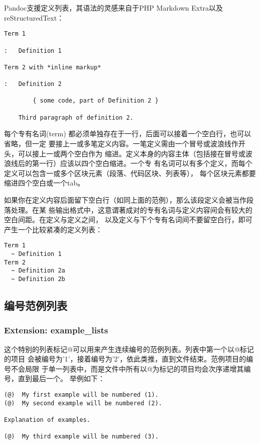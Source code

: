 \documentclass[fancyhdr,bookmark]{ctexbook}
\begin{document}
Pandoc支援定义列表，其语法的灵感来自于PHP Markdown
Extra以及reStructuredText：

\begin{lstlisting}
Term 1

:   Definition 1

Term 2 with *inline markup*

:   Definition 2

        { some code, part of Definition 2 }

    Third paragraph of definition 2.
\end{lstlisting}

每个专有名词(term)
都必须单独存在于一行，后面可以接着一个空白行，也可以省略，但一定
要接上一或多笔定义内容。一笔定义需由一个冒号或波浪线作开头，可以接上一或两个空白作为
缩进。定义本身的内容主体（包括接在冒号或波浪线后的第一行）应该以四个空白缩进。一个专
有名词可以有多个定义，而每个定义可以包含一或多个区块元素（段落、代码区块、列表等），
每个区块元素都要缩进四个空白或一个tab。

如果你在定义内容后面留下空白行（如同上面的范例），那么该段定义会被当作段落处理。在某
些输出格式中，这意谓著成对的专有名词与定义内容间会有较大的空白间距。在定义与定义之间，
以及定义与下个专有名词间不要留空白行，即可产生一个比较紧凑的定义列表：

\begin{lstlisting}
Term 1
  ~ Definition 1
Term 2
  ~ Definition 2a
  ~ Definition 2b
\end{lstlisting}

\subsection{编号范例列表}\label{ux7f16ux53f7ux8303ux4f8bux5217ux8868}

\subsubsection{Extension:
example\_lists}\label{extension-exampleux5flists}

这个特别的列表标记@可以用来产生连续编号的范例列表。列表中第一个以@标记的项目
会被编号为'1'，接着编号为'2'，依此类推，直到文件结束。范例项目的编号不会局限
于单一列表中，而是文件中所有以@为标记的项目均会次序递增其编号，直到最后一个。
举例如下：

\begin{lstlisting}
(@)  My first example will be numbered (1).
(@)  My second example will be numbered (2).

Explanation of examples.

(@)  My third example will be numbered (3).
\end{lstlisting}
\end{document}
